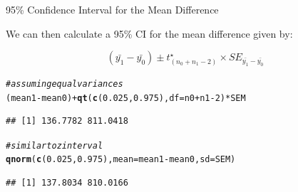 \documentclass[10pt,handout]{beamer}\usepackage[]{graphicx}\usepackage[]{color}
\makeatletter
\newcommand{\hlnum}[1]{\textcolor[rgb]{0.686,0.059,0.569}{#1}}%
\newcommand{\hlcom}[1]{\textcolor[rgb]{0.678,0.584,0.686}{\textit{#1}}}%
\newcommand{\hlopt}[1]{\textcolor[rgb]{0,0,0}{#1}}%
\newcommand{\hlstd}[1]{\textcolor[rgb]{0.345,0.345,0.345}{#1}}%
\newcommand{\hlkwc}[1]{\textcolor[rgb]{0.333,0.667,0.333}{#1}}%
\newcommand{\hlkwd}[1]{\textcolor[rgb]{0.737,0.353,0.396}{\textbf{#1}}}%
\newenvironment{kframe}{%
 \def\at@end@of@kframe{}%
 \ifinner\ifhmode%
  \def\at@end@of@kframe{\end{minipage}}%
  \begin{minipage}{\columnwidth}%
 \fi\fi%
 \def\FrameCommand##1{\hskip\@totalleftmargin \hskip-\fboxsep
 \colorbox{shadecolor}{##1}\hskip-\fboxsep
     \hskip-\linewidth \hskip-\@totalleftmargin \hskip\columnwidth}%
 \MakeFramed {\advance\hsize-\width
   \@totalleftmargin\z@ \linewidth\hsize
   \@setminipage}}%
 {\par\unskip\endMakeFramed%
 \at@end@of@kframe}
\newenvironment{knitrout}{}{} %
\makeatother
\begin{document}
\begin{frame}[fragile]{95\% Confidence Interval for the Mean Difference}
	
	We can then calculate a 95\% CI for the mean difference given by:
	
	\begin{equation}
		(\bar{y_1} - \bar{y_0}) \pm t^\star_{(n_0 + n_1 - 2)} \times SE_{\bar{y_1} - \bar{y_0}}
	\end{equation}
	
	\pause 
	
\begin{knitrout}\scriptsize
{}\color{fgcolor}\begin{kframe}
\begin{alltt}
\hlcom{# assuming equal variances}
\hlstd{(mean1} \hlopt{-} \hlstd{mean0)} \hlopt{+} \hlkwd{qt}\hlstd{(}\hlkwd{c}\hlstd{(}\hlnum{0.025}\hlstd{,} \hlnum{0.975}\hlstd{),} \hlkwc{df} \hlstd{= n0} \hlopt{+} \hlstd{n1} \hlopt{-} \hlnum{2}\hlstd{)} \hlopt{*} \hlstd{SEM}
\end{alltt}
\begin{verbatim}
## [1] 136.7782 811.0418
\end{verbatim}
\begin{alltt}
\hlcom{# similar to z interval}
\hlkwd{qnorm}\hlstd{(}\hlkwd{c}\hlstd{(}\hlnum{0.025}\hlstd{,} \hlnum{0.975}\hlstd{),} \hlkwc{mean} \hlstd{= mean1} \hlopt{-} \hlstd{mean0,} \hlkwc{sd} \hlstd{= SEM)}
\end{alltt}
\begin{verbatim}
## [1] 137.8034 810.0166
\end{verbatim}
\end{kframe}
\end{knitrout}
	
	
\end{frame}
\end{document}
